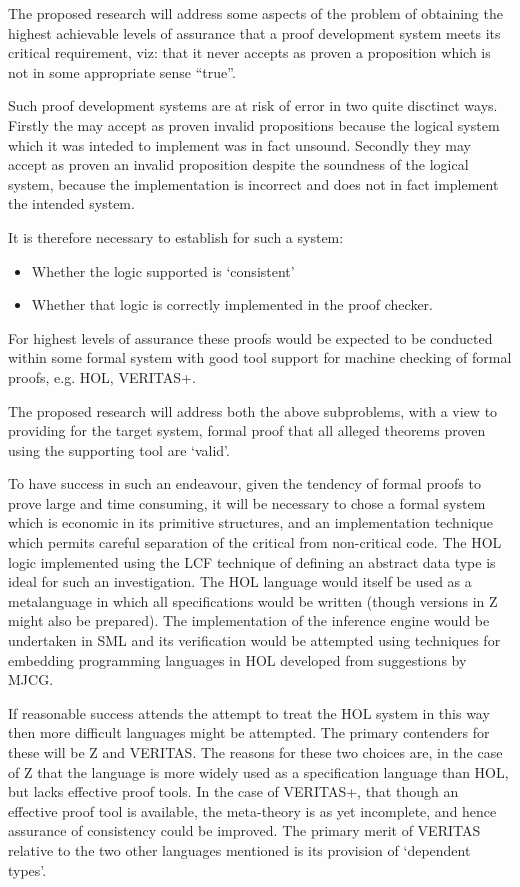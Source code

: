 The proposed research will address some aspects of the problem of obtaining the highest achievable levels of assurance that a proof development system meets its critical requirement, viz: that it never accepts as proven a proposition which is not in some appropriate sense ``true''.

Such proof development systems are at risk of error in two quite disctinct ways.
Firstly the may accept as proven invalid propositions because the logical system which it was inteded to implement was in fact unsound.
Secondly they may accept as proven an invalid proposition despite the soundness of the logical system, because the implementation is incorrect and does not in fact implement the intended system.

It is therefore necessary to establish for such a system:
\begin{itemize}
\item{}
Whether the logic supported is `consistent'
\item{}
Whether that logic is correctly implemented in the proof checker.
\end{itemize}

For highest levels of assurance these proofs would be expected to be conducted within some formal system with good tool support for machine checking of formal proofs, e.g. HOL, VERITAS+.

The proposed research will address both the above subproblems, with a view to providing for the target system, formal proof that all alleged theorems proven using the supporting tool are `valid'.

To have success in such an endeavour, given the tendency of formal proofs to prove large and time consuming, it will be necessary to chose a formal system which is economic in its primitive structures, and an implementation technique which permits careful separation of the critical from non-critical code.
The HOL logic implemented using the LCF technique of defining an abstract data type is ideal for such an investigation.
The HOL language would itself be used as a metalanguage in which all specifications would be written (though versions in Z might also be prepared).
The implementation of the inference engine would be undertaken in SML and its verification would be attempted using techniques for embedding programming languages in HOL developed from suggestions by MJCG.

If reasonable success attends the attempt to treat the HOL system in this way then more difficult languages might be attempted.
The primary contenders for these will be Z and VERITAS.
The reasons for these two choices are, in the case of Z that the language is more widely used as a specification language than HOL, but lacks effective proof tools.
In the case of VERITAS+, that though an effective proof tool is available, the meta-theory is as yet incomplete, and hence assurance of consistency could be improved.
The primary merit of VERITAS relative to the two other languages mentioned is its provision of `dependent types'.




